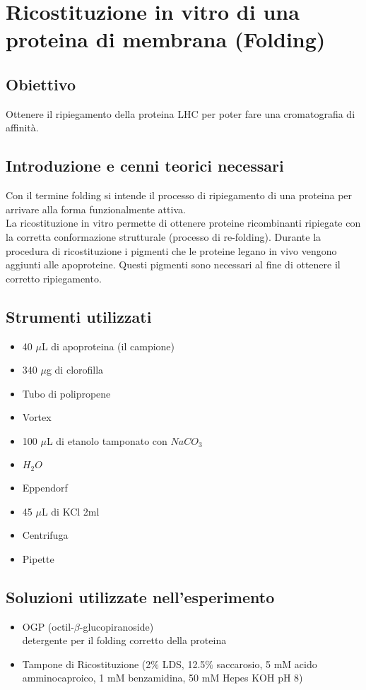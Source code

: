 \documentclass{extarticle}
\begin{document}
\newpage
\section{Ricostituzione in vitro di una proteina di membrana (Folding)}
\subsection*{Obiettivo}
Ottenere il ripiegamento della proteina LHC per poter fare una cromatografia di affinità.
\subsection*{Introduzione e cenni teorici necessari}
Con il termine folding si intende il processo di ripiegamento di una proteina per
arrivare alla forma funzionalmente attiva.\\
La ricostituzione in vitro permette di ottenere proteine ricombinanti ripiegate con la corretta conformazione strutturale (processo di re-folding). Durante la procedura di ricostituzione i pigmenti che le proteine legano in vivo vengono aggiunti alle apoproteine. Questi pigmenti sono necessari al fine di ottenere il corretto ripiegamento. 
\subsection*{Strumenti utilizzati}
\begin{itemize}
    \item 40 $\mu$L di apoproteina (il campione)
    \item 340 $\mu$g di clorofilla
    \item Tubo di polipropene
    \item Vortex
    \item 100 $\mu$L di etanolo tamponato con $NaCO_{3}$
    \item $H_{2}O$
    \item Eppendorf
    \item 45 $\mu$L di KCl 2ml
    \item Centrifuga
    \item Pipette
\end{itemize}
\subsection*{Soluzioni utilizzate nell'esperimento}
\begin{itemize}
    \item OGP (octil-$\beta$-glucopiranoside)\\
    detergente per il folding corretto della proteina
    \item Tampone di Ricostituzione (2$\%$ LDS, 12.5$\%$ saccarosio, 5 mM acido amminocaproico, 1 mM benzamidina, 50 mM Hepes KOH pH 8)
\end{itemize}
\end{document}
